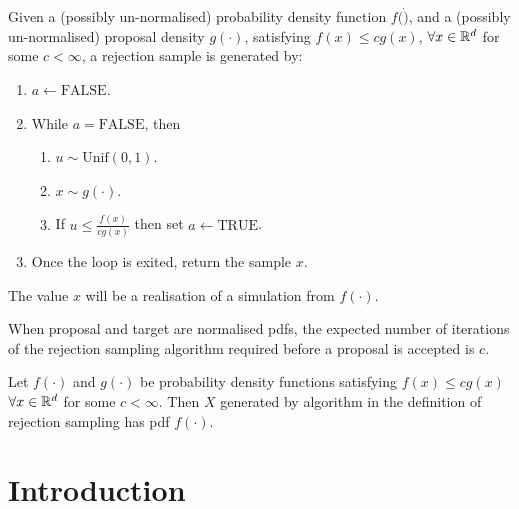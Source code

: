\documentclass[10pt, a4paper]{article}
\begin{document}
\begin{definition}
    Given a
    (possibly un-normalised)
    probability density function $f(\dot)$,
    and a
    (possibly un-normalised)
    proposal density $g(\cdot)$,
    satisfying $f(x) \leq cg(x)$,
    $\forall x \in \mathbb{R} ^ d$ for some $c < \infty$,
    a rejection sample is generated by:
    
    \begin{enumerate}[label = (\arabic*)]
        \item $a \leftarrow \text{FALSE}$.
        
        \item While $a = \text{FALSE}$,
        then
        \begin{enumerate}[label = (\roman*)]
            \item $u \sim \mathrm{Unif}(0, 1)$.

            \item $x \sim g(\cdot)$.

            \item If $u \leq \frac{f(x)}{cg(x)}$ then set $a \leftarrow \text{TRUE}$.
        \end{enumerate}
        
        \item Once the loop is exited,
        return the sample $x$.
    \end{enumerate}
    The value $x$ will be a realisation of a simulation from $f(\cdot)$.
\end{definition}

\begin{lemma}
    When proposal and target are normalised pdfs,
    the expected number of iterations of the rejection sampling algorithm required before a proposal is accepted is $c$.
\end{lemma}

\begin{theorem}
    Let $f(\cdot)$ and $g(\cdot)$ be probability density functions satisfying $f(x) \leq cg(x)$ $\forall x \in \mathbb{R} ^ d$ for some $c < \infty$.
    Then $X$ generated by algorithm in the definition of rejection sampling has pdf $f(\cdot)$.
\end{theorem}

\newpage

\section{Introduction}
\end{document}
